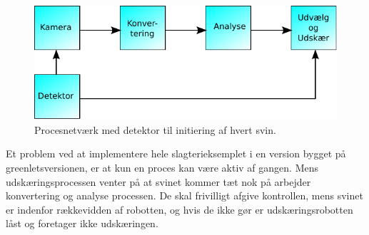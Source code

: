 \begin{figure}
 \begin{center}
  \includegraphics[scale=1]{images/pig-network2}
	\caption{Procesnetværk med detektor til initiering af hvert svin.}
	\label{fig:pig-network2}
\end{center}
\end{figure}

Et problem ved at implementere hele slagterieksemplet i en version bygget på greenletsversionen, er at kun en proces kan være aktiv af gangen. Mens udskæringsprocessen venter på at svinet kommer tæt nok på arbejder konvertering og analyse processen. De skal frivilligt afgive kontrollen, mens svinet er indenfor rækkevidden af robotten, og hvis de ikke gør er udskæringsrobotten låst og  foretager  ikke udskæringen.



